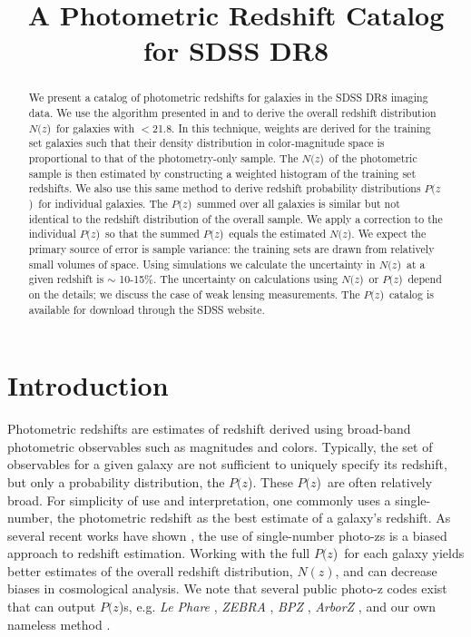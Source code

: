 \documentclass[preprint]{aastex}
\newcommand{\localbias}{10-15\%}
\newcommand{\rmax}{21.8}
\newcommand{\pofz}{$P(z$)}
\newcommand{\Nofz}{$N(z$)}
\begin{document}
\title{A Photometric Redshift Catalog for SDSS DR8}



\begin{abstract}

We present a catalog of photometric redshifts for galaxies in the SDSS DR8
imaging data.  We use the algorithm presented in \citet{LimaPhotoz08} and
\citet{CunhaPhotoz09} to derive the overall redshift distribution \Nofz\ for
galaxies with \rmag$ < $\rmax.  In this technique, weights are derived for the
training set galaxies such that their density distribution in color-magnitude
space is proportional to that of the photometry-only sample. The \Nofz\ of the
photometric sample is then estimated by constructing a weighted histogram of
the training set redshifts.  We also use this same method to derive redshift
probability distributions \pofz\ for individual galaxies.  The \pofz\ summed
over all galaxies is similar but not identical to the redshift distribution of
the overall sample. We apply a correction to the individual \pofz\ so that the
summed \pofz\ equals the estimated \Nofz.  We expect the primary source of
error is sample variance: the training sets are drawn from relatively small
volumes of space.  Using simulations we calculate the uncertainty in \Nofz\ at
a given redshift is $\sim$ \localbias.  The uncertainty on calculations using
\Nofz\ or \pofz\ depend on the details; we discuss the case of weak lensing
measurements.  The \pofz\ catalog is available for download through the SDSS
website.  


\end{abstract}

\section{Introduction} \label{sec:intro}

Photometric redshifts are estimates of redshift derived using broad-band
photometric observables such as magnitudes and colors.  Typically, the set of
observables for a given galaxy are not sufficient to uniquely specify its
redshift, but only a probability distribution, the \pofz.  These \pofz\ are
often relatively broad. For simplicity of use and interpretation, one commonly
uses a single-number, the photometric redshift as the best estimate of a
galaxy's redshift.  As several recent works have shown
\citep{man08,CunhaPhotoz09,wit09,bor10,abr11}, the use of single-number
photo-zs is a biased approach to redshift estimation.  Working with the full
\pofz\ for each galaxy yields better estimates of the overall redshift
distribution, $N(z)$, and can decrease biases in cosmological analysis.  We
note that several public photo-z codes exist that can output \pofz s, e.g.
{\it Le Phare} \citep{arn99,ilb06}, {\it ZEBRA} \citep{fel06}, {\it BPZ} \citep{coe06}, {\it
ArborZ} \citep{ger10}, and our own nameless method \citep{CunhaPhotoz09}.
\end{document}
